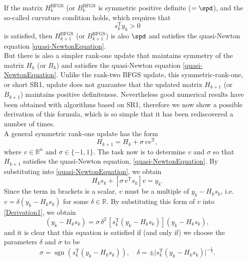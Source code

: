 If the matrix $H^{\mathrm{BFGS}}_k$ (or $B^{\mathrm{BFGS}}_k$ is symmetric positive definite ($= \spd$), and the so-called curvature condition holds, which requires that 
\begin{equation}\label{CurvatureCondition}
    s^{\mathrm{T}}_k y_k > 0
\end{equation}
is satisfied, then $H^{\mathrm{BFGS}}_{k+1}$ (or $B^{\mathrm{BFGS}}_{k+1}$) is also $\spd$ and satisfies the quasi-Newton equation \cref{quasi-NewtonEquation}. \\
But there is also a simpler rank-one update that maintains symmetry of the matrix $H_k$ (or $B_k$) and satisfies the quasi-Newton equation \cref{quasi-NewtonEquation}. Unlike the rank-two BFGS update, this symmetric-rank-one, or short SR1, update does not guarantee that the updated matrix $H_{k+1}$ (or $B_{k+1}$) maintains positive definiteness. Nevertheless good numerical results have been obtained with algorithms based on SR1, therefore we now show a possible derivation of this formula, which is so simple that it has been rediscovered a number of times. \\
A general symmetric rank-one update has the form
\begin{equation*}
    H_{k+1} = H_k + \sigma \, v v^{\mathrm{T}},
\end{equation*}
where $v \in \mathbb{R}^n$ and $\sigma \in \{-1,1\}$. The task now is to determine $v$ and $\sigma$ so that $H_{k+1}$ satisfies the quasi-Newton equation, \cref{quasi-NewtonEquation}. By substituting into \cref{quasi-NewtonEquation}, we obtain
\begin{equation}\label{Derivation1}
    H_k s_k + [\sigma \, v^{\mathrm{T}} s_k] v = y_k.
\end{equation}
Since the term in brackets is a scalar, $v$ must be a multiple of $y_k − H_k s_k$, i.e. $v = \delta (y_k − H_k s_k)$ for some $\delta \in \mathbb{R}$. By substituting this form of $v$ into \cref{Derivation1}, we obtain
\begin{equation}\label{Derivation2}
    (y_k − H_k s_k) = \sigma \, \delta^2 \, [s^{\mathrm{T}}_k (y_k − H_k s_k)](y_k − H_k s_k),
\end{equation}
and it is clear that this equation is satisfied if (and only if) we choose the parameters $\delta$ and $\sigma$ to be
\begin{equation*}
    \sigma = \operatorname{sgn} (s^{\mathrm{T}}_k (y_k − H_k s_k)), \quad \delta = \pm \lvert s^{\mathrm{T}}_k (y_k − H_k s_k) \rvert^{-\frac{1}{2}}.
\end{equation*}
